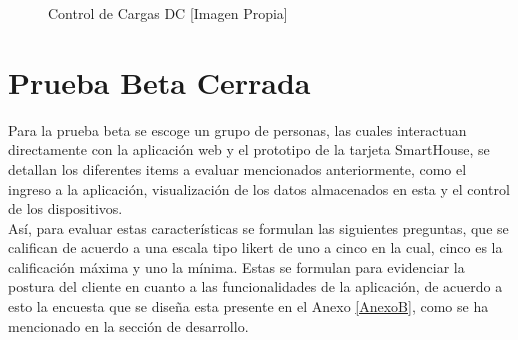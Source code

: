 \begin{figure}[H]
	\centering
	\caption{Control de Cargas DC [Imagen Propia]}
	\label{fig:DCc}
\end{figure}

\section{Prueba Beta Cerrada}

Para la prueba beta se escoge un grupo de personas, las cuales interactuan directamente con la aplicación web y el prototipo de la tarjeta SmartHouse, se detallan los diferentes items a evaluar mencionados anteriormente, como el ingreso a la aplicación, visualización de los datos almacenados en esta y el control de los dispositivos.\\

Así, para evaluar estas características se formulan las siguientes preguntas, que se califican de acuerdo a una escala tipo likert \cite{lik} de uno a cinco en la cual, cinco es la calificación máxima y uno la mínima. Estas se formulan para evidenciar la postura del cliente en cuanto a las funcionalidades de la aplicación, de acuerdo a esto la encuesta que se diseña esta presente en el Anexo \ref{AnexoB}, como se ha mencionado en la sección de desarrollo.

